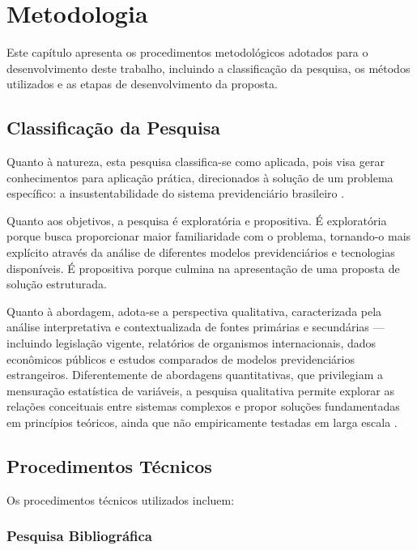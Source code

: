 \chapter{Metodologia}
\label{cap:metodologia}

Este capítulo apresenta os procedimentos metodológicos adotados para o desenvolvimento deste trabalho, incluindo a classificação da pesquisa, os métodos utilizados e as etapas de desenvolvimento da proposta.

\section{Classificação da Pesquisa}

Quanto à natureza, esta pesquisa classifica-se como aplicada, pois visa gerar conhecimentos para aplicação prática, direcionados à solução de um problema específico: a insustentabilidade do sistema previdenciário brasileiro \cite{gil2008}.

Quanto aos objetivos, a pesquisa é exploratória e propositiva. É exploratória porque busca proporcionar maior familiaridade com o problema, tornando-o mais explícito através da análise de diferentes modelos previdenciários e tecnologias disponíveis. É propositiva porque culmina na apresentação de uma proposta de solução estruturada.

Quanto à abordagem, adota-se a perspectiva qualitativa, caracterizada pela análise interpretativa e contextualizada de fontes primárias e secundárias — incluindo legislação vigente, relatórios de organismos internacionais, dados econômicos públicos e estudos comparados de modelos previdenciários estrangeiros. Diferentemente de abordagens quantitativas, que privilegiam a mensuração estatística de variáveis, a pesquisa qualitativa permite explorar as relações conceituais entre sistemas complexos e propor soluções fundamentadas em princípios teóricos, ainda que não empiricamente testadas em larga escala \cite{creswell2014}.

\section{Procedimentos Técnicos}

Os procedimentos técnicos utilizados incluem:

\subsection{Pesquisa Bibliográfica}


